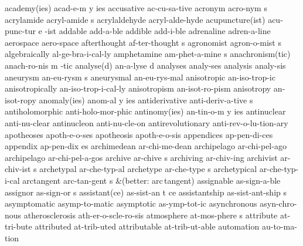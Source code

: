 \begingroup
\eightpoint
\3 academy(ies)		acad-e-m y ies
\1 accusative		ac-cu-sa-tive		%
\NewWordtrue
\5 acronym		acro-nym s		%
\5 acrylamide		acryl-amide s		%
\1 acrylaldehyde	acryl-alde-hyde		%
\3 acupuncture(ist)	acu-punc-tur e -ist	%
\1 addable		add-a-ble
\1 addible		add-i-ble
\1 adrenaline		adren-a-line
\1 aerospace		aero-space
\5 afterthought 	af-ter-thought s
\5 agronomist		agron-o-mist s
\1 algebraically	al-ge-bra-i-cal-ly	%
\5 amphetamine		am-phet-a-mine s
\NewWordtrue
\3 anachronism(tic)	anach-ro-nis m -tic	%
\2 analyse(d)		an-a-lyse d
\1 analyses		analy-ses\thinspace*
\NewWordtrue
\1 analysis		analy-sis		%
\5 aneurysm		an-eu-rysm s		%
\1 aneurysmal		an-eu-rys-mal		%
\1 anisotropic		an-iso-trop-ic		%
\1 anisotropically	an-iso-trop-i-cal-ly	%
\1 anisotropism		an-isot-ro-pism 	%
\1 anisotropy		an-isot-ropy		%
\3 anomaly(ies)		anom-al y ies
\5 antiderivative	anti-deriv-a-tive s
\1 antiholomorphic	anti-holo-mor-phic	%
\3 antinomy(ies)	an-tin-o-m y ies
\1 antinuclear		anti-nu-clear
\1 antinucleon		anti-nu-cle-on
\1 antirevolutionary	anti-rev-o-lu-tion-ary
\1 apotheoses		apoth-e-o-ses
\1 apotheosis		apoth-e-o-sis
\NewWordtrue
\1 appendices		ap-pen-di-ces		%
\NewWordtrue
\5 appendix		ap-pen-dix es		%
\1 archimedean		ar-chi-me-dean		%
\1 archipelago		ar-chi-pel-ago       %
\1 archipelago		ar-chi-pel-a-gos
\5 archive		ar-chive s              %
\1 archiving		ar-chiv-ing             %
\5 archivist		ar-chiv-ist s           %
\1 archetypal		ar-che-typ-al
\5 archetype		ar-che-type s		%
\1 archetypical		ar-che-typ-i-cal
\5 arctangent		arc-tan-gent s
\tabalign		&\null\quad (better: arc\,tangent)\cr
\1 assignable		as-sign-a-ble
\5 assignor		as-sign-or s
\3 assistant(ce)	as-sist-an t ce		%
\5 assistantship	as-sist-ant-ship s
\1 asymptomatic		asymp-to-matic
\1 asymptotic		as-ymp-tot-ic
\1 asynchronous		asyn-chro-nous
\1 atherosclerosis	ath-er-o-scle-ro-sis
\5 atmosphere		at-mos-phere s
\1 attribute		at-tri-bute		%
\1 attributed		at-trib-uted
\1 attributable		at-trib-ut-able
\1 automation		au-to-ma-tion           %
